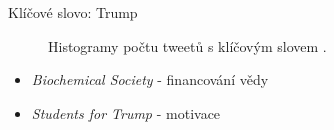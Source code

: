 \documentclass[notheorems,12pt]{beamer}
\begin{document}
\begin{frame}{Klíčové slovo: Trump}
    \vspace{-1cm}
    \begin{figure}
        \centering
        \hspace{-0.5cm}
        \vspace{-0.7cm}
        \caption*{Histogramy počtu tweetů s klíčovým slovem \textit{}.}
    \end{figure}
	\begin{itemize}
		\item \textit{Biochemical Society} - financování vědy
		\item \textit{Students for Trump} - motivace
	\end{itemize}
\end{frame}
\end{document}
